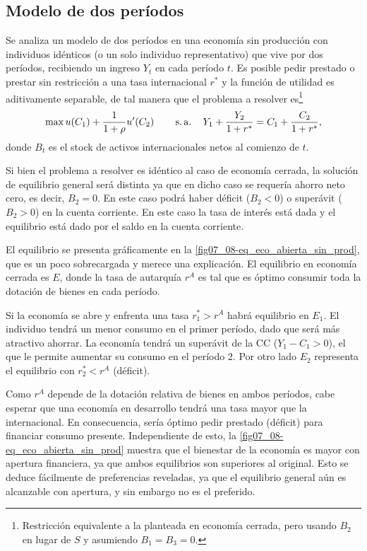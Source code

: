 \documentclass[DeGregorioResumen]{subfiles}
\begin{document}


\subsection{Modelo de dos períodos}

Se analiza un modelo de dos períodos en una economía sin producción con individuos idénticos (o un solo individuo representativo) que vive por dos períodos, recibiendo un ingreso $Y_t$ en cada período $t$. Es posible pedir prestado o prestar sin restricción a una tasa internacional $r^*$ y la función de utilidad es aditivamente separable, de tal manera que el problema a resolver es\footnote{Restricción equivalente a la planteada en economía cerrada, pero usando $B_2$ en lugar de $S$ y asumiendo $B_1=B_3=0$.}
\begin{equation}
	\max u(C_1) + \frac{1}{1+\rho}u'(C_2) \operatorname{\qquad s.a.\quad} Y_1 + \frac{Y_2}{1+r^*} = C_1 + \frac{C_2}{1+r^*},
\end{equation}
donde $B_t$ es el stock de activos internacionales netos al comienzo de $t$.

Si bien el problema a resolver es idéntico al caso de economía cerrada, la solución de equilibrio general será distinta ya que en dicho caso se requería ahorro neto cero, es decir, $B_2=0$. En este caso podrá haber déficit ($B_2<0$) o superávit ($B_2>0$) en la cuenta corriente. En este caso la tasa de interés está dada y el equilibrio está dado por el saldo en la cuenta corriente.

El equilibrio se presenta gráficamente en la \autoref{fig07_08-eq_eco_abierta_sin_prod}, que es un poco sobrecargada y merece una explicación. El equilibrio en economía cerrada es $E$, donde la tasa de autarquía $r^A$ es tal que es óptimo consumir toda la dotación de bienes en cada período.

Si la economía se abre y enfrenta una tasa $r_1^*>r^A$ habrá equilibrio en $E_1$. El individuo tendrá un menor consumo en el primer período, dado que será más atractivo ahorrar. La economía tendrá un superávit de la CC ($Y_1-C_1>0$), el que le permite aumentar su consumo en el período 2. Por otro lado $E_2$ representa el equilibrio con $r_2^*<r^A$ (déficit).



Como $r^A$ depende de la dotación relativa de bienes en ambos períodos, cabe esperar que una economía en desarrollo tendrá una tasa mayor que la internacional. En consecuencia, sería óptimo pedir prestado (déficit) para financiar consumo presente. Independiente de esto, la \autoref{fig07_08-eq_eco_abierta_sin_prod} muestra que el bienestar de la economía es mayor con apertura financiera, ya que ambos equilibrios son superiores al original. Esto se deduce fácilmente de preferencias reveladas, ya que el equilibrio general aún es alcanzable con apertura, y sin embargo no es el preferido.
\end{document}
